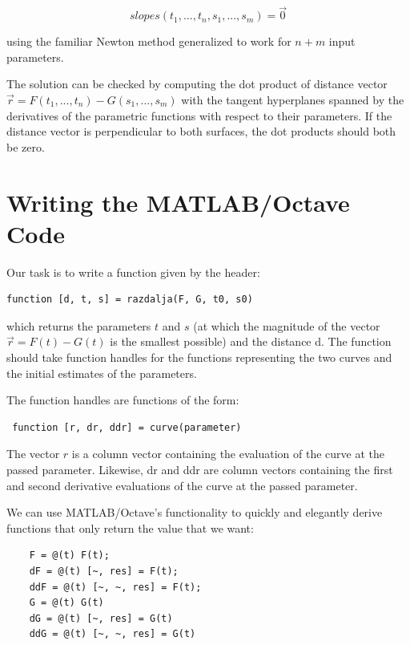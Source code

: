 \documentclass[A4]{article}
\begin{document}
\begin{equation}
slopes(t_{1},...,t_{n}, s_{1},...,s_{m}) = \vec{0}
\end{equation}

using the familiar Newton method generalized to work for $n+m$ input parameters.

The solution can be checked by computing the dot product of distance vector
$\vec{r} = F(t_{1},...,t_{n}) - G(s_{1},...,s_{m})$  with the tangent hyperplanes spanned by the derivatives of the parametric functions with respect to their parameters. If the distance vector is perpendicular to both surfaces, the dot products should both be zero.

\newpage

\section{Writing the MATLAB/Octave Code}

Our task is to write a function given by the header:
\vspace{0.2cm}
\begin{tcolorbox}
	\begin{verbatim}
function [d, t, s] = razdalja(F, G, t0, s0) 
	\end{verbatim}
\end{tcolorbox}

which returns the parameters $t$ and $s$ (at which the magnitude of the vector $\vec{r} = F(t) - G(t)$ is the smallest possible) and the distance d. The function should take function handles for the functions representing the two curves and the initial estimates of the parameters.

The function handles are functions of the form:
\vspace{0.2cm}
\begin{tcolorbox}
	\begin{verbatim}
 function [r, dr, ddr] = curve(parameter)
 	\end{verbatim}
\end{tcolorbox}

The vector $r$ is a column vector containing the evaluation of the curve at the passed parameter. Likewise, dr and ddr are column vectors
containing the first and second derivative evaluations of the curve at the passed parameter.

We can use MATLAB/Octave's functionality to quickly and elegantly derive functions that only return the value that we want:
\vspace{0.2cm}
\begin{tcolorbox} 
	\begin{verbatim}
	F = @(t) F(t);
	dF = @(t) [~, res] = F(t);
	ddF = @(t) [~, ~, res] = F(t);
	G = @(t) G(t)
	dG = @(t) [~, res] = G(t)
	ddG = @(t) [~, ~, res] = G(t)
	\end{verbatim}
\end{tcolorbox}
\end{document}
